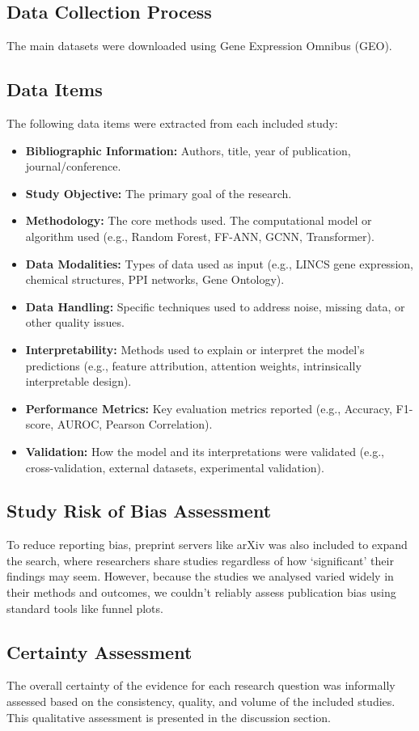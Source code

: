 \documentclass[twocolumn,12pt,a4paper]{article}
\begin{document}
\subsection{Data Collection Process}
The main datasets were downloaded using Gene Expression Omnibus (GEO). 

\subsection{Data Items}
The following data items were extracted from each included study:
\begin{itemize}
    \item \textbf{Bibliographic Information: }Authors, title, year of publication, journal/conference.
    \item \textbf{Study Objective: }The primary goal of the research.
    \item \textbf{Methodology: }The core methods used. The computational model or algorithm used (e.g., Random Forest, FF-ANN, GCNN, Transformer).
    \item \textbf{Data Modalities: }Types of data used as input (e.g., LINCS gene expression, chemical structures, PPI networks, Gene Ontology).
    \item \textbf{Data Handling: }Specific techniques used to address noise, missing data, or other quality issues.
    \item \textbf{Interpretability: }Methods used to explain or interpret the model's predictions (e.g., feature attribution, attention weights, intrinsically interpretable design).
    \item \textbf{Performance Metrics: }Key evaluation metrics reported (e.g., Accuracy, F1-score, AUROC, Pearson Correlation).
    \item \textbf{Validation: }How the model and its interpretations were validated (e.g., cross-validation, external datasets, experimental validation).
\end{itemize}
\subsection{Study Risk of Bias Assessment}
To reduce reporting bias, preprint servers like arXiv was also included to expand the search, where researchers share studies regardless of how `significant' their findings may seem. However, because the studies we analysed varied widely in their methods and outcomes, we couldn’t reliably assess publication bias using standard tools like funnel plots.
\subsection{Certainty Assessment}
The overall certainty of the evidence for each research question was informally assessed based on the consistency, quality, and volume of the included studies. This qualitative assessment is presented in the discussion section.
\end{document}
